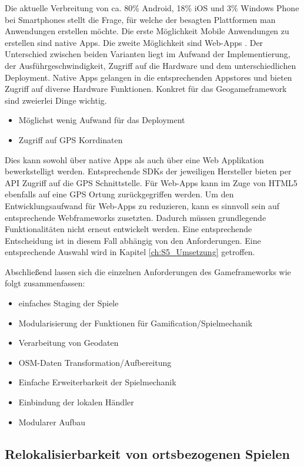 Die aktuelle Verbreitung von ca. 80\% Android, 18\% iOS und 3\% Windows Phone bei Smartphones stellt die Frage, für welche der besagten Plattformen man Anwendungen erstellen möchte.
Die erste Möglichkeit Mobile Anwendungen zu erstellen sind native Apps. Die zweite Möglichkeit sind Web-Apps \cite{Charland.2011}.
Der Unterschied zwischen beiden Varianten liegt im Aufwand der Implementierung, der Ausführgeschwindigkeit, Zugriff auf die Hardware und dem unterschiedlichen Deployment.
Native Apps gelangen in die entsprechenden Appstores und bieten Zugriff auf diverse Hardware Funktionen.
Konkret für das Geogameframework sind zweierlei Dinge wichtig.

\begin{itemize}
\item Möglichst wenig Aufwand für das Deployment
\item Zugriff auf GPS Korrdinaten
\end{itemize}

Dies kann sowohl über native  Apps als auch über eine Web Applikation bewerkstelligt werden. Entsprechende SDKs der jeweiligen Hersteller bieten per API Zugriff auf die GPS Schnittstelle. Für Web-Apps kann im Zuge von HTML5 ebenfalls auf eine GPS Ortung zurückgegriffen werden.\cite{Holdener.2011}
Um den Entwicklungsaufwand für Web-Apps zu reduzieren, kann es sinnvoll sein auf entsprechende Webframeworks zusetzten. Dadurch müssen grundlegende Funktionalitäten nicht erneut entwickelt werden.
Eine entsprechende Entscheidung ist in diesem Fall abhängig von den Anforderungen. Eine entsprechende Auswahl wird in Kapitel \ref{ch:S5_Umsetzung} getroffen.

Abschließend lassen sich die einzelnen Anforderungen des Gameframeworks wie folgt zusammenfassen:

\begin{itemize}
\item einfaches Staging der Spiele
\item Modularisierung der Funktionen für Gamification/Spielmechanik
\item Verarbeitung von Geodaten
\item OSM-Daten Transformation/Aufbereitung
\item Einfache Erweiterbarkeit der Spielmechanik
\item Einbindung der lokalen Händler
\item Modularer Aufbau
\end{itemize}


\subsection*{Relokalisierbarkeit von ortsbezogenen Spielen}

